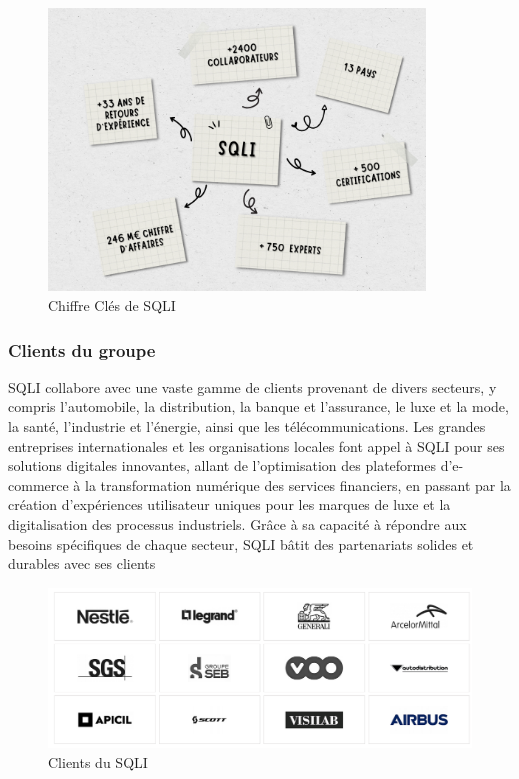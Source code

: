 \begin{figure}[H]
    \centering
    \includegraphics[width=10cm]{Figures/cle chiffre.png} %
    \caption{Chiffre Clés de SQLI}
\end{figure}

\subsubsection{Clients du groupe}

SQLI collabore avec une vaste gamme de clients provenant de divers secteurs, y compris l'automobile, la distribution, la banque et l'assurance, le luxe et la mode, la santé, l'industrie et l'énergie, ainsi que les télécommunications. Les grandes entreprises internationales et les organisations locales font appel à SQLI pour ses solutions digitales innovantes, allant de l'optimisation des plateformes d'e-commerce à la transformation numérique des services financiers, en passant par la création d'expériences utilisateur uniques pour les marques de luxe et la digitalisation des processus industriels. Grâce à sa capacité à répondre aux besoins spécifiques de chaque secteur, SQLI bâtit des partenariats solides et durables avec ses clients

\begin{figure}[H]
    \centering
    \includegraphics[width=15cm]{Figures/sqli partenaire .png} %
    \caption{Clients du SQLI \cite{SQLI}}
\end{figure}


